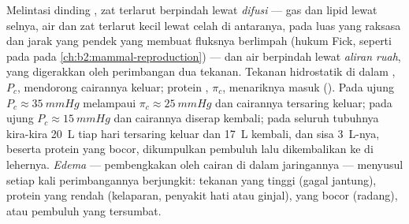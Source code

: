 \begin{proposition}\label{prop:b2:blood-circulation:exchange}
Melintasi dinding , zat terlarut berpindah lewat
\emph{difusi} --- gas dan lipid lewat selnya, air dan zat terlarut
kecil lewat celah di antaranya, pada luas yang raksasa dan jarak yang
pendek yang membuat fluksnya berlimpah (hukum Fick, seperti pada
 pada \cref{ch:b2:mammal-reproduction}) --- dan air berpindah
lewat \emph{aliran ruah}, yang digerakkan oleh perimbangan dua tekanan.
Tekanan hidrostatik di dalam , $P_c$, mendorong cairannya
keluar;  protein , $\pi_c$, menariknya masuk
(\emph{}). Pada ujung  $P_c \approx
\qty{35}{mmHg}$ melampaui $\pi_c \approx \qty{25}{mmHg}$ dan cairannya
tersaring keluar; pada ujung  $P_c \approx \qty{15}{mmHg}$ dan
cairannya diserap kembali; pada seluruh tubuhnya kira-kira \qty{20}{L}
tiap hari tersaring keluar dan \qty{17}{L} kembali, dan sisa
\qty{3}{L}-nya, beserta protein yang bocor, dikumpulkan pembuluh
\emph{} lalu dikembalikan ke  di lehernya.
\emph{Edema} --- pembengkakan oleh cairan di dalam jaringannya ---
menyusul setiap kali perimbangannya berjungkit: tekanan  yang
tinggi (gagal jantung), protein  yang rendah (kelaparan, penyakit
hati atau ginjal),  yang bocor (radang), atau pembuluh  yang tersumbat.
\end{proposition}

